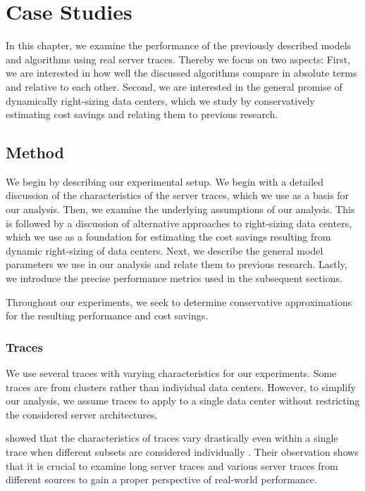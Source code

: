 
\chapter{Case Studies}\label{chapter:case_studies}

In this chapter, we examine the performance of the previously described models and algorithms using real server traces. Thereby we focus on two aspects: First, we are interested in how well the discussed algorithms compare in absolute terms and relative to each other. Second, we are interested in the general promise of dynamically right-sizing data centers, which we study by conservatively estimating cost savings and relating them to previous research.

\section{Method}

We begin by describing our experimental setup. We begin with a detailed discussion of the characteristics of the server traces, which we use as a basis for our analysis. Then, we examine the underlying assumptions of our analysis. This is followed by a discussion of alternative approaches to right-sizing data centers, which we use as a foundation for estimating the cost savings resulting from dynamic right-sizing of data centers. Next, we describe the general model parameters we use in our analysis and relate them to previous research. Lastly, we introduce the precise performance metrics used in the subsequent sections.

Throughout our experiments, we seek to determine conservative approximations for the resulting performance and cost savings.

\subsection{Traces}\label{section:case_studies:method:traces}

We use several traces with varying characteristics for our experiments. Some traces are from clusters rather than individual data centers. However, to simplify our analysis, we assume traces to apply to a single data center without restricting the considered server architectures.

\citeauthor*{Amvrosiadis2018} showed that the characteristics of traces vary drastically even within a single trace when different subsets are considered individually \cite{Amvrosiadis2018}. Their observation shows that it is crucial to examine long server traces and various server traces from different sources to gain a proper perspective of real-world performance.

